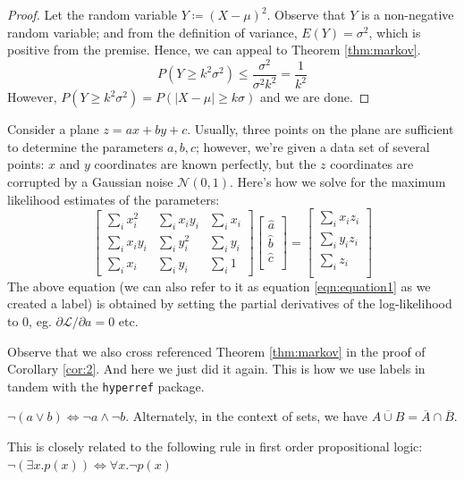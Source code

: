 \documentclass[a4paper]{article}
\begin{document}
\begin{proof}
    Let the random variable $ Y \coloneqq (X -\mu)^2 $. Observe that $Y$ is a non-negative random variable;
    and from the definition of variance, $E(Y) = \sigma^2$, which is positive from the premise. Hence, we can appeal to Theorem \ref{thm:markov}.
    $$ P(Y \geq k^2\sigma^2) \leq \frac{\sigma^2}{\sigma^2k^2} = \frac{1}{k^2} $$
    However, $ P(Y \geq k^2\sigma^2) = P(|X-\mu| \geq k\sigma)$ and we are done.
\end{proof}
\noindent
Consider a plane $z = ax + by + c$. Usually, three points on the plane are sufficient to determine the parameters $a, b, c$; however, we're given a data set of several points: $x$ and $y$ coordinates are
known perfectly, but the $z$ coordinates are corrupted by a Gaussian noise $\mathcal{N}(0, 1)$. Here's how we solve for the maximum likelihood estimates of the parameters:
\begin{equation}
    \label{eqn:equation1}
    \begin{bmatrix}
        \sum_i x^2_i  & \sum_i x_iy_i & \sum_i x_i \\
        \sum_i x_iy_i & \sum_i y^2_i  & \sum_i y_i \\
        \sum_i x_i    & \sum_i y_i    & \sum_i 1
    \end{bmatrix}
    \begin{bmatrix}
        \hat a \\
        \hat b \\
        \hat c \\
    \end{bmatrix}
    =
    \begin{bmatrix}
        \sum_i x_iz_i \\
        \sum_i y_iz_i \\
        \sum_i z_i    \\
    \end{bmatrix}
\end{equation}
The above equation (we can also refer to it as equation \ref{eqn:equation1} as we created a label) is obtained by setting the partial derivatives of the log-likelihood to 0, eg. $ \partial \mathcal{L}/ \partial a = 0$ etc.\par\medskip
Observe that we also cross referenced Theorem \ref{thm:markov} in the proof of Corollary \ref{cor:2}. And here we just
did it again. This is how we use labels in tandem with the \verb!hyperref! package.

\setcounter{thm}{2}
\begin{thm}
    $ \neg (a \lor b) \iff \neg a \land \neg b$. Alternately, in the context of sets, we
    have $ \overline{A \cup B} = \overline A \cap \overline B.$
\end{thm}
\begin{remark}
    This is closely related to the following rule in first order propositional logic: $ \neg (\exists x.p(x)) \iff \forall x.\neg p(x) $
\end{remark}
\end{document}
